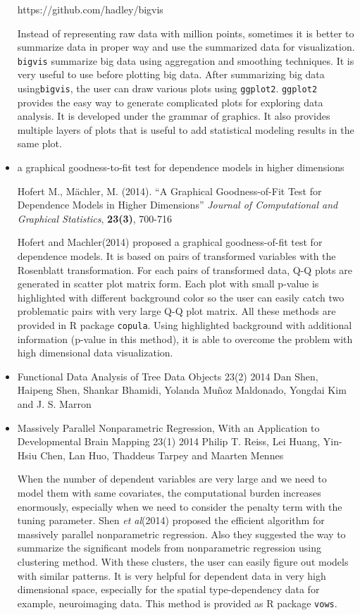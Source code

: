 \documentclass{article}
\begin{document}
\begin{itemize}
https://github.com/hadley/bigvis

Instead of representing raw data with million points, sometimes it is better to summarize data in  proper way and use the summarized data for visualization. {\tt bigvis} summarize big data using aggregation and smoothing techniques. It is very useful to use before plotting big data. After summarizing big data using{\tt bigvis}, the user can draw various plots using {\tt ggplot2}. {\tt ggplot2} provides the easy way to generate complicated plots for exploring data analysis. It is developed under the grammar of graphics. It also provides multiple layers of plots that is useful to add statistical modeling results in the same plot.


\item a graphical goodness-to-fit test for dependence models in higher dimensions

Hofert M., M\"{a}chler, M. (2014).
``A Graphical Goodness-of-Fit Test for
Dependence Models in Higher Dimensions''
{\em Journal of Computational and Graphical Statistics}, {\bf 23(3)}, 700-716

Hofert and Machler(2014) proposed a graphical goodness-of-fit test for dependence models.
It is based on pairs of transformed variables with the Rosenblatt transformation. For each pairs of transformed data, Q-Q plots are generated in scatter plot matrix form. Each plot with small p-value is highlighted with different background color so the user can easily catch two problematic pairs with very large Q-Q plot matrix. All these methods are provided in R package {\tt copula}. Using highlighted background with additional information (p-value in this method), it is able to overcome the problem with high dimensional data visualization.

\item Functional Data Analysis of Tree Data Objects 23(2) 2014
Dan Shen, Haipeng Shen, Shankar Bhamidi, Yolanda Muñoz Maldonado, Yongdai Kim and J. S. Marron



\item Massively Parallel Nonparametric Regression, With an Application to Developmental Brain Mapping 23(1) 2014
Philip T. Reiss, Lei Huang, Yin-Hsiu Chen, Lan Huo, Thaddeus Tarpey and Maarten Mennes


When the number of dependent variables are very large and we need to model them with same covariates,
 the computational burden increases enormously, especially when we need to consider the penalty term with the tuning parameter. Shen {\it et al}(2014) proposed  the efficient algorithm for massively parallel nonparametric regression.
 Also they suggested the way to summarize the significant models from nonparametric regression using clustering method. With these clusters, the user can easily figure out models with similar patterns. It is very helpful for dependent data in very high dimensional space, especially for the spatial type-dependency data for example, neuroimaging data. This method is provided as R package {\tt vows}.



\end{itemize}
\end{document}
